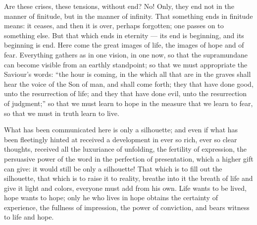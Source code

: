 \documentclass[12pt,a4paper,openany]{book}
\begin{document}
Are these crises, these tensions, without end? No! Only, they end not in the manner of finitude, but in the manner of
infinity. That something ends in finitude means: it ceases, and then it is over, perhaps forgotten; one passes on to
something else. But that which ends in eternity --- its end is beginning, and its beginning is end. Here come the great
images of life, the images of hope and of fear. Everything gathers as in one vision, in one now, so that the
supramundane can become visible from an earthly standpoint; so that we must appropriate the Saviour's words: ``the
hour is coming, in the which all that are in the graves shall hear the voice of the Son of man, and shall come forth;
they that have done good, unto the resurrection of life; and they that have done evil, unto the resurrection of
judgment;'' so that we must learn to hope in the measure that we learn to fear, so that we must in truth learn to
live.

What has been communicated here is only a silhouette; and even if what has been fleetingly hinted at received a
development in ever so rich, ever so clear thoughts, received all the luxuriance of unfolding, the fertility of
expression, the persuasive power of the word in the perfection of presentation, which a higher gift can give: it would
still be only a silhouette! That which is to fill out the silhouette, that which is to raise it to reality, breathe
into it the breath of life and give it light and colors, everyone must add from his own. Life wants to be lived, hope
wants to hope; only he who lives in hope obtains the certainty of experience, the fullness of impression, the power of
conviction, and bears witness to life and hope.
\end{document}
